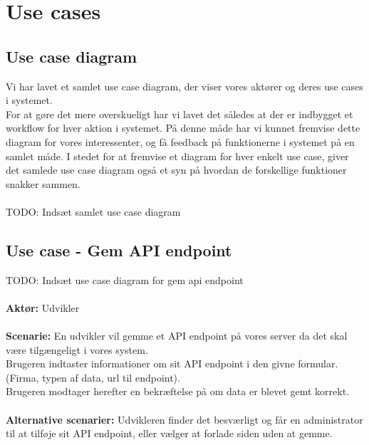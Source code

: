 \section{Use cases}
\subsection{Use case diagram}
Vi har lavet et samlet use case diagram, der viser vores aktører og deres use cases i systemet.\\
For at gøre det mere overskueligt har vi lavet det således at der er indbygget et workflow for hver aktion i systemet.
På denne måde har vi kunnet fremvise dette diagram for vores interessenter, og få feedback på funktionerne i systemet på en samlet måde.
I stedet for at fremvise et diagram for hver enkelt use case, giver det samlede use case diagram  også et syn på hvordan de forskellige funktioner snakker sammen.
\\\\
TODO: Indsæt samlet use case diagram
\subsection{Use case - Gem API endpoint}
TODO: Indsæt use case diagram for gem api endpoint
\\\\
\textbf{Aktør:} Udvikler
\\\\
\textbf{Scenarie:} En udvikler vil gemme et API endpoint på vores server da det skal være tilgængeligt i vores system. \\
Brugeren indtaster informationer om sit API endpoint i den givne formular. (Firma, typen af data, url til endpoint). \\
Brugeren modtager herefter en bekræftelse på om data er blevet gemt korrekt.
\\\\
\textbf{Alternative scenarier:} Udvikleren finder det besværligt og får en administrator til at tilføje sit API endpoint,
eller vælger at forlade siden uden at gemme.
